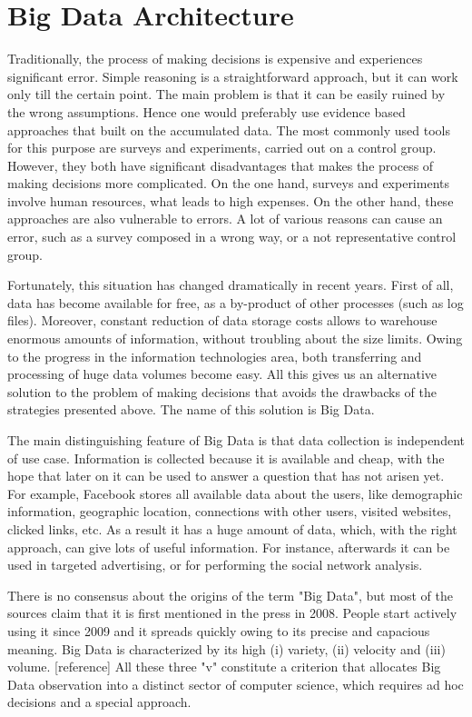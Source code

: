 \chapter{Big Data Architecture}
\label{chap:big_data_architecture}

Traditionally, the process of making decisions is expensive and experiences significant error.
Simple reasoning is a straightforward approach, but it can work only till the certain point.
The main problem is that it can be easily ruined by the wrong assumptions.
Hence one would preferably use evidence based approaches that built on the accumulated data.
The most commonly used tools for this purpose are surveys and experiments, carried out on a control group.   
However, they both have significant disadvantages that makes the process of making decisions more complicated. 
On the one hand, surveys and experiments involve human resources, what leads to high expenses.
On the other hand, these approaches are also vulnerable to errors.
A lot of various reasons can cause an error, such as a survey composed in a wrong way, or a not representative control group.
 
Fortunately, this situation has changed dramatically in recent years.
First of all, data has become available for free, as a by-product of other processes (such as log files).
Moreover, constant reduction of data storage costs allows to warehouse enormous amounts of information, without troubling about the size limits.
Owing to the progress in the information technologies area, both transferring and processing of huge data volumes become easy.
All this gives us an alternative solution to the problem of making decisions that avoids the drawbacks of the strategies presented above.
The name of this solution is Big Data.

The main distinguishing feature of Big Data is that data collection is independent of use case.
Information is collected because it is available and cheap, with the hope that later on it can be used to answer a question that has not arisen yet.
For example, Facebook stores all available data about the users, like demographic information, geographic location, connections with other users, visited websites, clicked links, etc.
As a result it has a huge amount of data, which, with the right approach, can give lots of useful information. 
For instance, afterwards it can be used in targeted advertising, or for performing the social network analysis.

There is no consensus about the origins of the term "Big Data", but most of the sources claim that it is first mentioned in the press in 2008.
People start actively using it since 2009 and it spreads quickly owing to its precise and capacious meaning. 
Big Data is characterized by its high (i) variety, (ii) velocity and (iii) volume. [reference]
All these three "v" constitute a criterion that allocates Big Data observation into a distinct sector of computer science, which requires ad hoc decisions and a special approach.

